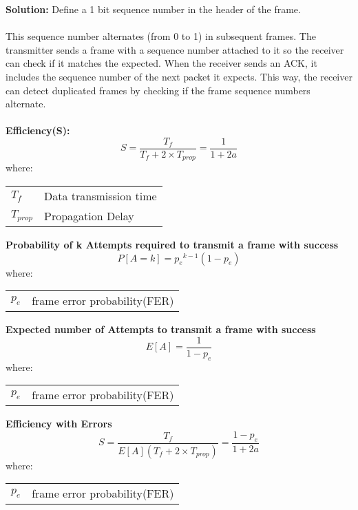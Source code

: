 \documentclass[../resumosRCOM.tex]{subfiles}
\makeatletter
\newenvironment{conditions}
  {\par\vspace{\abovedisplayskip}\noindent\begin{tabular}{>{$}l<{$} @{${}={}$} l}}
  {\end{tabular}\par\vspace{\belowdisplayskip}}
\makeatother
\begin{document}
\textbf{Solution:}
Define a 1 bit sequence number in the header of the frame.

\paragraph{}
This sequence number alternates (from 0 to 1) in subsequent frames. The transmitter sends
a frame with a sequence number attached to it so the receiver can check if it matches the 
expected.  When the receiver sends an ACK, it includes the sequence number of the next 
packet it expects.  This way, the receiver can detect duplicated frames by checking if the
frame sequence numbers alternate.

\paragraph{}
\textbf{Efficiency(S):}
\begin{equation}
    {S}=\frac{T_f}{T_f + 2 \times T_{prop}} = \frac{1}{1+2a}
\end{equation}
where:
\begin{conditions}
   T_f     &   Data transmission time\\
   T_{prop} &  Propagation Delay 
\end{conditions}

\textbf{Probability of k Attempts required to transmit a frame with success} 
\begin{equation}
    {P[A=k]}= {p_e}^{k-1} {(1-p_e)} 
\end{equation}
where:
\begin{conditions}
    p_e & frame error probability(FER)
\end{conditions}

\textbf{Expected number of Attempts to transmit a frame with success} 
\begin{equation}
    {E[A]}= \frac{1}{1-p_e} 
\end{equation}
where:
\begin{conditions}
    p_e & frame error probability(FER)
\end{conditions}

\textbf{Efficiency with Errors} 
\begin{equation}
    {S}= \frac{T_f}{E[A](T_f + 2 \times T_{prop})} = \frac{1-p_e}{1+2a}
\end{equation}
where:
\begin{conditions}
    p_e & frame error probability(FER)
\end{conditions}
\end{document}

